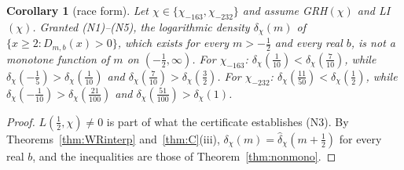 \documentclass[11pt]{amsart}
\newtheorem{corollary}[theorem]{Corollary}
\theoremstyle{definition}
\numberwithin{equation}{section}
\newcommand{\hd}{\widehat\delta}
\begin{document}
\begin{corollary}[race form]\label{cor:nonmono}
Let $\chi\in\{\chi_{-163},\chi_{-232}\}$ and assume GRH$(\chi)$ and
LI$(\chi)$. Granted \textup{(N1)--(N5)}, the logarithmic density
$\delta_\chi(m)$ of $\{x\ge2:D_{m,b}(x)>0\}$, which exists for every
$m>-\tfrac12$ and every real $b$, is not a monotone function of $m$ on
$(-\tfrac12,\infty)$. For $\chi_{-163}$:
$\delta_\chi(\tfrac1{10})<\delta_\chi(\tfrac7{10})$, while
$\delta_\chi(-\tfrac15)>\delta_\chi(\tfrac1{10})$ and
$\delta_\chi(\tfrac7{10})>\delta_\chi(\tfrac32)$. For $\chi_{-232}$:
$\delta_\chi(\tfrac{11}{50})<\delta_\chi(\tfrac12)$, while
$\delta_\chi(-\tfrac1{10})>\delta_\chi(\tfrac{21}{100})$ and
$\delta_\chi(\tfrac{51}{100})>\delta_\chi(1)$.
\end{corollary}

\begin{proof}
$L(\tfrac12,\chi)\ne0$ is part of what the certificate establishes
(N3). By Theorems~\ref{thm:WRinterp} and~\ref{thm:C}(iii),
$\delta_\chi(m)=\hd_\chi(m+\tfrac12)$ for every real $b$, and the
inequalities are those of Theorem~\ref{thm:nonmono}.
\end{proof}
\end{document}
